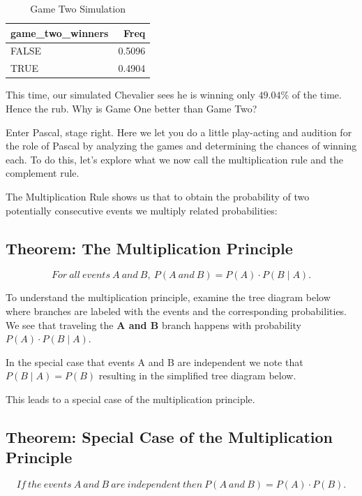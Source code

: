 \documentclass[]{book}
\theoremstyle{definition}
\theoremstyle{definition}
\theoremstyle{definition}
\theoremstyle{remark}
\begin{document}
\begin{table}

\caption{\label{tab:nice-tab-62}Game Two Simulation}
\centering
\begin{tabular}[t]{lr}
\toprule
game\_two\_winners & Freq\\
\midrule
FALSE & 0.5096\\
TRUE & 0.4904\\
\bottomrule
\end{tabular}
\end{table}

This time, our simulated Chevalier sees he is winning only \(49.04\%\)
of the time. Hence the rub. Why is Game One better than Game Two?

Enter Pascal, stage right. Here we let you do a little play-acting and
audition for the role of Pascal by analyzing the games and determining
the chances of winning each. To do this, let's explore what we now call
the multiplication rule and the complement rule.

The Multiplication Rule shows us that to obtain the probability of two
potentially consecutive events we multiply related probabilities:

\subsection{Theorem: The Multiplication
Principle}\label{theorem-the-multiplication-principle}

\[For \ all \ events \ A \ and \ B, \ P(A \ and \ B)= P(A) \cdot P(B \mid A).\]

To understand the multiplication principle, examine the tree diagram
below where branches are labeled with the events and the corresponding
probabilities. We see that traveling the \textbf{A and B} branch happens
with probability \(P(A) \cdot P(B \mid A)\).

In the special case that events A and B are independent we note that
\(P(B \mid A) = P(B)\) resulting in the simplified tree diagram below.

This leads to a special case of the multiplication principle.

\subsection{Theorem: Special Case of the Multiplication
Principle}\label{theorem-special-case-of-the-multiplication-principle}

\[If \ the \ events \ A \ and \ B \ are \ independent \ then \ P(A \ and \ B) = P(A) \cdot P(B).\]
\end{document}
